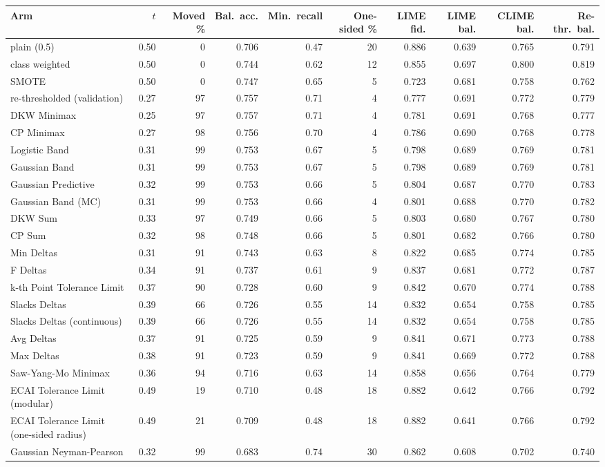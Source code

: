 \begin{tabular}{@{}lrrrrrrrrr@{}}
  \toprule
  Arm & $t$ & Moved \% & Bal.\ acc. & Min.\ recall & One-sided \% & LIME fid. & LIME bal. & CLIME bal. & Re-thr.\ bal. \\
  \midrule
  plain (0.5) & 0.50 & 0 & 0.706 & 0.47 & 20 & 0.886 & 0.639 & 0.765 & 0.791 \\
  class weighted & 0.50 & 0 & 0.744 & 0.62 & 12 & 0.855 & 0.697 & 0.800 & 0.819 \\
  SMOTE & 0.50 & 0 & 0.747 & 0.65 & 5 & 0.723 & 0.681 & 0.758 & 0.762 \\
  re-thresholded (validation) & 0.27 & 97 & 0.757 & 0.71 & 4 & 0.777 & 0.691 & 0.772 & 0.779 \\
  \midrule
  DKW Minimax & 0.25 & 97 & 0.757 & 0.71 & 4 & 0.781 & 0.691 & 0.768 & 0.777 \\
  CP Minimax & 0.27 & 98 & 0.756 & 0.70 & 4 & 0.786 & 0.690 & 0.768 & 0.778 \\
  Logistic Band & 0.31 & 99 & 0.753 & 0.67 & 5 & 0.798 & 0.689 & 0.769 & 0.781 \\
  Gaussian Band & 0.31 & 99 & 0.753 & 0.67 & 5 & 0.798 & 0.689 & 0.769 & 0.781 \\
  Gaussian Predictive & 0.32 & 99 & 0.753 & 0.66 & 5 & 0.804 & 0.687 & 0.770 & 0.783 \\
  Gaussian Band (MC) & 0.31 & 99 & 0.753 & 0.66 & 4 & 0.801 & 0.688 & 0.770 & 0.782 \\
  DKW Sum & 0.33 & 97 & 0.749 & 0.66 & 5 & 0.803 & 0.680 & 0.767 & 0.780 \\
  CP Sum & 0.32 & 98 & 0.748 & 0.66 & 5 & 0.801 & 0.682 & 0.766 & 0.780 \\
  Min Deltas & 0.31 & 91 & 0.743 & 0.63 & 8 & 0.822 & 0.685 & 0.774 & 0.785 \\
  F Deltas & 0.34 & 91 & 0.737 & 0.61 & 9 & 0.837 & 0.681 & 0.772 & 0.787 \\
  k-th Point Tolerance Limit & 0.37 & 90 & 0.728 & 0.60 & 9 & 0.842 & 0.670 & 0.774 & 0.788 \\
  Slacks Deltas & 0.39 & 66 & 0.726 & 0.55 & 14 & 0.832 & 0.654 & 0.758 & 0.785 \\
  Slacks Deltas (continuous) & 0.39 & 66 & 0.726 & 0.55 & 14 & 0.832 & 0.654 & 0.758 & 0.785 \\
  Avg Deltas & 0.37 & 91 & 0.725 & 0.59 & 9 & 0.841 & 0.671 & 0.773 & 0.788 \\
  Max Deltas & 0.38 & 91 & 0.723 & 0.59 & 9 & 0.841 & 0.669 & 0.772 & 0.788 \\
  Saw-Yang-Mo Minimax & 0.36 & 94 & 0.716 & 0.63 & 14 & 0.858 & 0.656 & 0.764 & 0.779 \\
  ECAI Tolerance Limit (modular) & 0.49 & 19 & 0.710 & 0.48 & 18 & 0.882 & 0.642 & 0.766 & 0.792 \\
  ECAI Tolerance Limit (one-sided radius) & 0.49 & 21 & 0.709 & 0.48 & 18 & 0.882 & 0.641 & 0.766 & 0.792 \\
  Gaussian Neyman-Pearson & 0.32 & 99 & 0.683 & 0.74 & 30 & 0.862 & 0.608 & 0.702 & 0.740 \\
  \bottomrule
\end{tabular}
